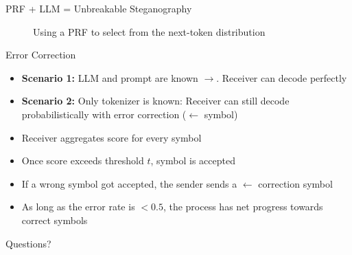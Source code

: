 \documentclass[8pt]{beamer}
\begin{document}
\begin{frame}{PRF + LLM = Unbreakable Steganography}
\begin{figure}
    \caption{Using a PRF to select from the next-token distribution}
    \label{fig:placeholder}
\end{figure}
    
\end{frame}

\begin{frame}{Error Correction}
    
    \begin{itemize}
        \item \textbf{Scenario 1:} LLM and prompt are known $\rightarrow$. Receiver can decode perfectly
        \item \textbf{Scenario 2:} Only tokenizer is known: Receiver can still decode probabilistically with error correction ($\leftarrow$ symbol)
        \item Receiver aggregates score for every symbol 
        \item Once score exceeds threshold $t$, symbol is accepted
        \item If a wrong symbol got accepted, the sender sends a $\leftarrow$ correction symbol
        \item As long as the error rate is $<0.5$, the process has net progress towards correct symbols
    \end{itemize}

    
\end{frame}

\begin{frame}
    \centering
    \Huge Questions?
\end{frame}
\end{document}
